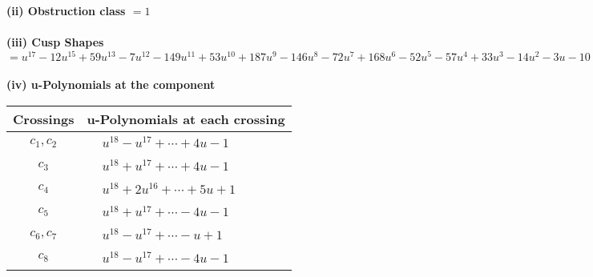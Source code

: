 \documentclass[1p]{elsarticle_modified}
\theoremstyle{definition}
\begin{document}
\flushleft \textbf{(ii) Obstruction class $= 1$}\\~\\
\flushleft \textbf{(iii) Cusp Shapes $= u^{17}-12 u^{15}+59 u^{13}-7 u^{12}-149 u^{11}+53 u^{10}+187 u^9-146 u^8-72 u^7+168 u^6-52 u^5-57 u^4+33 u^3-14 u^2-3 u-10$}\\~\\
\newpage\renewcommand{\arraystretch}{1}
\flushleft \textbf{(iv) u-Polynomials at the component}\newline \\
\begin{tabular}{m{50pt}|m{274pt}}
Crossings & \hspace{64pt}u-Polynomials at each crossing \\
\hline $$\begin{aligned}c_{1},c_{2}\end{aligned}$$&$\begin{aligned}
&u^{18}- u^{17}+\cdots+4 u-1
\end{aligned}$\\
\hline $$\begin{aligned}c_{3}\end{aligned}$$&$\begin{aligned}
&u^{18}+u^{17}+\cdots+4 u-1
\end{aligned}$\\
\hline $$\begin{aligned}c_{4}\end{aligned}$$&$\begin{aligned}
&u^{18}+2 u^{16}+\cdots+5 u+1
\end{aligned}$\\
\hline $$\begin{aligned}c_{5}\end{aligned}$$&$\begin{aligned}
&u^{18}+u^{17}+\cdots-4 u-1
\end{aligned}$\\
\hline $$\begin{aligned}c_{6},c_{7}\end{aligned}$$&$\begin{aligned}
&u^{18}- u^{17}+\cdots- u+1
\end{aligned}$\\
\hline $$\begin{aligned}c_{8}\end{aligned}$$&$\begin{aligned}
&u^{18}- u^{17}+\cdots-4 u-1
\end{aligned}$\\

\end{tabular}
\end{document}

